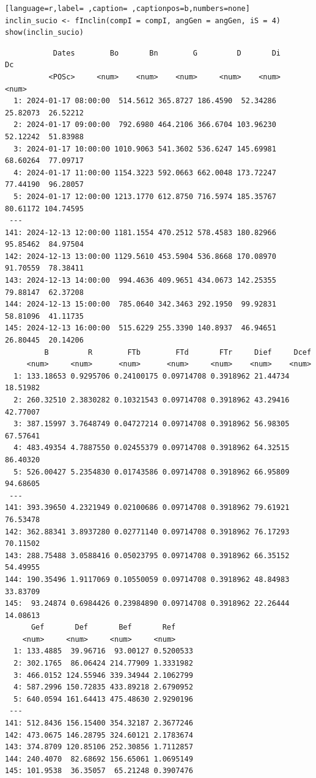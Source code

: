 \begin{itemize}
\begin{lstlisting}[language=r,label= ,caption= ,captionpos=b,numbers=none]
inclin_sucio <- fInclin(compI = compI, angGen = angGen, iS = 4)
show(inclin_sucio)
\end{lstlisting}

\begin{verbatim}
		   Dates        Bo       Bn        G         D       Di        Dc
		  <POSc>     <num>    <num>    <num>     <num>    <num>     <num>
  1: 2024-01-17 08:00:00  514.5612 365.8727 186.4590  52.34286 25.82073  26.52212
  2: 2024-01-17 09:00:00  792.6980 464.2106 366.6704 103.96230 52.12242  51.83988
  3: 2024-01-17 10:00:00 1010.9063 541.3602 536.6247 145.69981 68.60264  77.09717
  4: 2024-01-17 11:00:00 1154.3223 592.0663 662.0048 173.72247 77.44190  96.28057
  5: 2024-01-17 12:00:00 1213.1770 612.8750 716.5974 185.35767 80.61172 104.74595
 ---                                                                             
141: 2024-12-13 12:00:00 1181.1554 470.2512 578.4583 180.82966 95.85462  84.97504
142: 2024-12-13 13:00:00 1129.5610 453.5904 536.8668 170.08970 91.70559  78.38411
143: 2024-12-13 14:00:00  994.4636 409.9651 434.0673 142.25355 79.88147  62.37208
144: 2024-12-13 15:00:00  785.0640 342.3463 292.1950  99.92831 58.81096  41.11735
145: 2024-12-13 16:00:00  515.6229 255.3390 140.8937  46.94651 26.80445  20.14206
	     B         R        FTb        FTd       FTr     Dief     Dcef
	 <num>     <num>      <num>      <num>     <num>    <num>    <num>
  1: 133.18653 0.9295706 0.24100175 0.09714708 0.3918962 21.44734 18.51982
  2: 260.32510 2.3830282 0.10321543 0.09714708 0.3918962 43.29416 42.77007
  3: 387.15997 3.7648749 0.04727214 0.09714708 0.3918962 56.98305 67.57641
  4: 483.49354 4.7887550 0.02455379 0.09714708 0.3918962 64.32515 86.40320
  5: 526.00427 5.2354830 0.01743586 0.09714708 0.3918962 66.95809 94.68605
 ---                                                                      
141: 393.39650 4.2321949 0.02100686 0.09714708 0.3918962 79.61921 76.53478
142: 362.88341 3.8937280 0.02771140 0.09714708 0.3918962 76.17293 70.11502
143: 288.75488 3.0588416 0.05023795 0.09714708 0.3918962 66.35152 54.49955
144: 190.35496 1.9117069 0.10550059 0.09714708 0.3918962 48.84983 33.83709
145:  93.24874 0.6984426 0.23984890 0.09714708 0.3918962 22.26444 14.08613
	  Gef       Def       Bef       Ref
	<num>     <num>     <num>     <num>
  1: 133.4885  39.96716  93.00127 0.5200533
  2: 302.1765  86.06424 214.77909 1.3331982
  3: 466.0152 124.55946 339.34944 2.1062799
  4: 587.2996 150.72835 433.89218 2.6790952
  5: 640.0594 161.64413 475.48630 2.9290196
 ---                                       
141: 512.8436 156.15400 354.32187 2.3677246
142: 473.0675 146.28795 324.60121 2.1783674
143: 374.8709 120.85106 252.30856 1.7112857
144: 240.4070  82.68692 156.65061 1.0695149
145: 101.9538  36.35057  65.21248 0.3907476
\end{verbatim}


\end{itemize}
